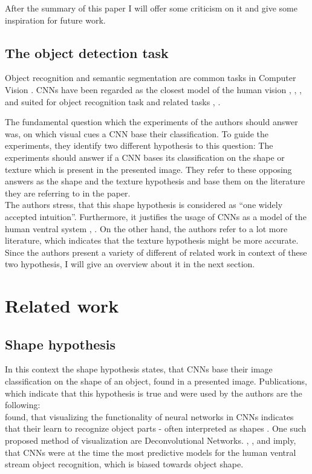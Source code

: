 \documentclass[runningheads,a4paper]{llncs}
\begin{document}
After the summary of this paper I will offer some criticism on it and give some inspiration for future work.


\subsection{The object detection task}
Object recognition and semantic segmentation are common tasks in Computer Vision 
. CNNs have been regarded as the closest model of the human vision \citep{kubilius2016}, \cite{ritter2017cognitive}, \cite{cadieu2014deep}, \citep{yamins2014performance} and suited for object recognition task and related tasks \citep{krizhevsky2012imagenet}, \cite{long2015fully}.

The fundamental question which the experiments of the authors should answer was, on which visual cues a CNN base their classification. To guide the experiments, they identify two different hypothesis to this question: The experiments should answer if a CNN bases its classification on the shape or texture which is present in the presented image. They refer to these opposing answers as the shape and the texture hypothesis and base them on the literature they are referring to in the paper.\\

The authors stress, that this shape hypothesis is considered as ``one widely accepted intuition''\citep{geirhos2018imagenet}. Furthermore, it justifies the usage of CNNs as a model of the human ventral system \citep{cadieu2014deep}, \citep{yamins2014performance}. On the other hand, the authors refer to a lot more literature, which indicates that the texture hypothesis might be more accurate.\\

Since the authors present a variety of different of related work in context of these two hypothesis, I will give an overview about it in the next section.

\section{Related work}

\subsection{Shape hypothesis}
In this context the shape hypothesis states, that CNNs base their image classification on the shape of an object, found in a presented image. Publications, which indicate that this hypothesis is true and were used by the authors are the following:\\
\citep{zeiler2014visualizing} found, that visualizing the functionality of neural networks in CNNs indicates that their learn to recognize object parts - often interpreted as shapes \citep{ritter2017cognitive}. One such proposed method of visualization are Deconvolutional Networks. \citep{ritter2017cognitive}, \citep{cadieu2014deep}, \cite{yamins2014performance} and \citep{landau1988importance} imply, that CNNs were at the time the most predictive models for the human ventral stream object recognition, which is biased towards object shape.
\end{document}
